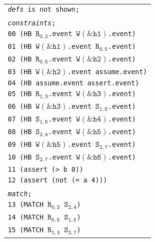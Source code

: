 \newsavebox{\boxSMTa}
\begin{lrbox}{\boxSMTa}
\begin{minipage}[c]{0.4\linewidth}
\begin{tabular}[t]{l}
\texttt{\textit{defs} is not shown;}\\
\\
\texttt{\textit{constraints};}\\
\texttt{00 (HB $\mathtt{R_{0,2}}$.event $\mathtt{W(\&h1)}$.event)}\\
\texttt{01 (HB $\mathtt{W(\&h1)}$.event $\mathtt{R_{0,5}}$.event)}\\
\texttt{02 (HB $\mathtt{R_{0,5}}$.event $\mathtt{W(\&h2)}$.event)}\\
\texttt{03 (HB $\mathtt{W(\&h2)}$.event assume.event)}\\
\texttt{04 (HB assume.event assert.event)}\\
\texttt{05 (HB $\mathtt{R_{1,3}}$.event $\mathtt{W(\&h3)}$.event)}\\
\texttt{06 (HB $\mathtt{W(\&h3)}$.event $\mathtt{S_{1,5}}$.event)}\\
\texttt{07 (HB $\mathtt{S_{1,5}}$.event $\mathtt{W(\&h4)}$.event)}\\
\texttt{08 (HB $\mathtt{S_{2,4}}$.event $\mathtt{W(\&h5)}$.event)}\\
\texttt{09 (HB $\mathtt{W(\&h5)}$.event $\mathtt{S_{2,7}}$.event)}\\
\texttt{10 (HB $\mathtt{S_{2,7}}$.event $\mathtt{W(\&h6)}$.event)}\\
\texttt{11 (assert (> b 0))}\\
\texttt{12 (assert (not (= a 4)))}\\
\\
\texttt{\textit{match};}\\
\texttt{13 (MATCH $\mathtt{R_{0,2}}$ $\mathtt{S_{2,4}}$)}\\
\texttt{14 (MATCH $\mathtt{R_{0,5}}$ $\mathtt{S_{1,5}}$)}\\
\texttt{15 (MATCH $\mathtt{R_{1,3}}$ $\mathtt{S_{2,7}}$)}\\

\end{tabular}
\end{minipage}
\end{lrbox}

